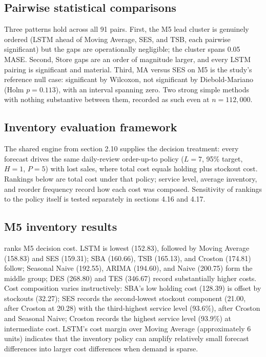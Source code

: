 \subsection{Pairwise statistical comparisons}
\label{sec:spotlight}
Three patterns hold across all 91 pairs. First, the M5 lead cluster is
genuinely ordered (LSTM ahead of Moving Average, SES, and TSB, each pairwise
significant) but the gaps are operationally negligible; the cluster spans
0.05 MASE. Second, Store gaps are an order of magnitude larger, and every
LSTM pairing is significant and material. Third, MA versus SES on M5 is the
study's reference null case: significant by Wilcoxon, not significant by
Diebold-Mariano (Holm $p=0.113$), with an interval spanning zero. Two strong
simple methods with nothing substantive between them, recorded as such even
at $n=112{,}000$.

\subsection{Inventory evaluation framework}
\label{sec:inv-frame}
The shared engine from section 2.10 supplies the decision treatment:
every forecast drives the same daily-review order-up-to policy ($L=7$, 95\%
target, $H=1$, $P=5$) with lost sales, where total cost equals holding plus
stockout cost. Rankings below are total cost under that policy; service
level, average inventory, and reorder frequency record how each cost was
composed. Sensitivity of rankings to the policy itself is tested separately
in sections 4.16 and 4.17.

\subsection{M5 inventory results}
\label{sec:m5-inv}
 ranks M5 decision cost. LSTM is lowest (152.83), followed by
Moving Average (158.83) and SES (159.31); SBA (160.66), TSB (165.13), and
Croston (174.81) follow; Seasonal Naive (192.55), ARIMA (194.60), and Naive
(200.75) form the middle group; DES (268.80) and TES (346.67) record
substantially higher costs. Cost composition varies instructively: SBA's low
holding cost (128.39) is offset by stockouts (32.27); SES records the second-lowest
stockout component (21.00, after Croston at 20.28) with the third-highest service level (93.6\%), after Croston and Seasonal Naive;
Croston records the highest service level (93.9\%) at intermediate cost.
LSTM's cost margin over Moving Average (approximately 6 units) indicates that the inventory policy can amplify relatively small forecast differences into larger cost differences when demand is sparse.

